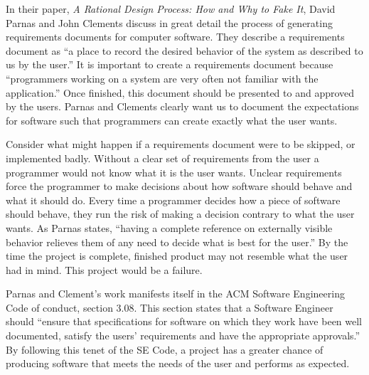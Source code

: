\documentclass[11pt]{article}
\begin{document}
\author{Mark Gius \\
        Section 03}
\date{\today}
\title{}

\maketitle

\newpage

In their paper, \emph{A Rational Design Process: How and Why to Fake It}, David Parnas and John Clements discuss in great detail the process of generating requirements documents for computer software.  They describe a requirements document as ``a place to record the desired behavior of the system as described to us by the user.''  It is important to create a requirements document because ``programmers working on a system are very often not familiar with the application.''  Once finished, this document should be presented to and approved by the users.  Parnas and Clements clearly want us to document the expectations for software such that programmers can create exactly what the user wants. 

Consider what might happen if a requirements document were to be skipped, or implemented badly.  Without a clear set of requirements from the user a programmer would not know what it is the user wants.  Unclear requirements force the programmer to make decisions about how software should behave and what it should do.  Every time a programmer decides how a piece of software should behave, they run the risk of making a decision contrary to what the user wants.  As Parnas states, ``having a complete reference on externally visible behavior relieves them of any need to decide what is best for the user.'' By the time the project is complete,  finished product may not resemble what the user had in mind.  This project would be a failure. 

Parnas and Clement's work manifests itself in the ACM Software Engineering Code of conduct, section 3.08.  This section states that a Software Engineer should ``ensure that specifications for software on which they work have been well documented, satisfy the users’ requirements and have the appropriate approvals.''  By following this tenet of the SE Code, a project has a greater chance of producing software that meets the needs of the user and performs as expected.

\newpage

\nocite{*}




\end{document}
